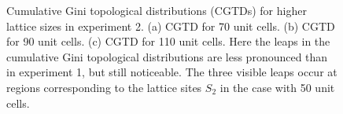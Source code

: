 \documentclass[fleqn,10pt]{wlscirep}
\begin{document}
\begin{figure}
\centering
{}
\caption{Cumulative Gini topological distributions (CGTDs) for higher lattice sizes in experiment 2. (a) CGTD for 70 unit cells. (b) CGTD for 90 unit cells. (c) CGTD for 110 unit cells. Here the leaps in the cumulative Gini topological distributions are less pronounced than in experiment 1, but still noticeable. The three visible leaps occur at regions corresponding to the lattice sites $S_2$ in the case with 50 unit cells.}
\label{cdf2}
\end{figure}
\end{document}
